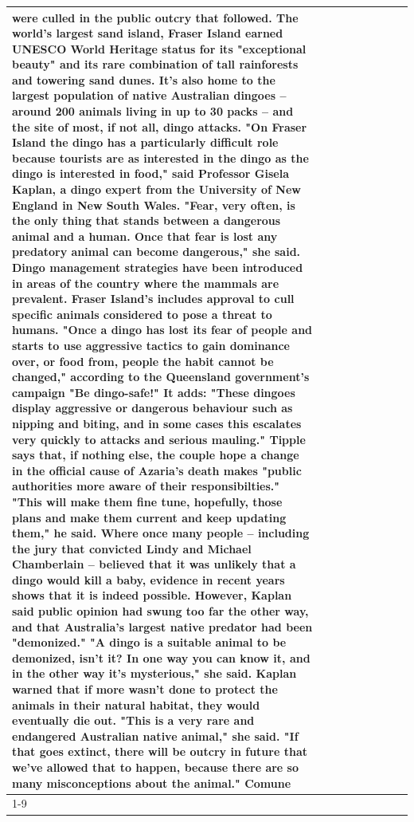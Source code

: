 \begin{table}[H]
\begin{tabular}{lllrlllll}
were culled in the public outcry that followed. The world's largest sand island, Fraser Island earned UNESCO World Heritage status for its "exceptional beauty" and its rare combination of tall rainforests and towering sand dunes. It's also home to the largest population of native Australian dingoes -- around 200 animals living in up to 30 packs -- and the site of most, if not all, dingo attacks. "On Fraser Island the dingo has a particularly difficult role because tourists are as interested in the dingo as the dingo is interested in food," said Professor Gisela Kaplan, a dingo expert from the University of New England in New South Wales. "Fear, very often, is the only thing that stands between a dangerous animal and a human. Once that fear is lost any predatory animal can become dangerous," she said. Dingo management strategies have been introduced in areas of the country where the mammals are prevalent. Fraser Island's includes approval to cull specific animals considered to pose a threat to humans. "Once a dingo has lost its fear of people and starts to use aggressive tactics to gain dominance over, or food from, people the habit cannot be changed," according to the Queensland government's campaign "Be dingo-safe!" It adds: "These dingoes display aggressive or dangerous behaviour such as nipping and biting, and in some cases this escalates very quickly to attacks and serious mauling." Tipple says that, if nothing else, the couple hope a change in the official cause of Azaria's death makes "public authorities more aware of their responsibilties." "This will make them fine tune, hopefully, those plans and make them current and keep updating them," he said. Where once many people -- including the jury that convicted Lindy and Michael Chamberlain -- believed that it was unlikely that a dingo would kill a baby, evidence in recent years shows that it is indeed possible. However, Kaplan said public opinion had swung too far the other way, and that Australia's largest native predator had been "demonized." "A dingo is a suitable animal to be demonized, isn't it? In one way you can know it, and in the other way it's mysterious," she said. Kaplan warned that if more wasn't done to protect the animals in their natural habitat, they would eventually die out. "This is a very rare and endangered Australian native animal," she said. "If that goes extinct, there will be outcry in future that we've allowed that to happen, because there are so many misconceptions about the animal." Comune \\
\cline{1-9}

\end{tabular}
\end{table}
